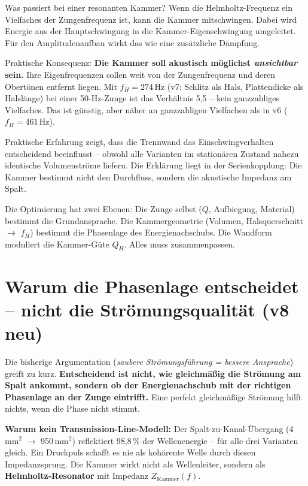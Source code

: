 \documentclass[11pt,a4paper]{article}
\begin{document}
Was passiert bei einer resonanten Kammer? Wenn die Helmholtz-Frequenz ein Vielfaches der Zungenfrequenz ist, kann die Kammer mitschwingen. Dabei wird Energie aus der Hauptschwingung in die Kammer-Eigenschwingung umgeleitet. Für den Amplitudenaufbau wirkt das wie eine zusätzliche Dämpfung.

Praktische Konsequenz: \textbf{Die Kammer soll akustisch möglichst \emph{unsichtbar} sein.} Ihre Eigenfrequenzen sollen weit von der Zungenfrequenz und deren Obertönen entfernt liegen. Mit $f_H = 274$\,Hz (v7: Schlitz als Hals, Plattendicke als Halslänge) bei einer 50-Hz-Zunge ist das Verhältnis 5{,}5 -- kein ganzzahliges Vielfaches. Das ist günstig, aber näher an ganzzahligen Vielfachen als in v6 ($f_H = 461$\,Hz).

Praktische Erfahrung zeigt, dass die Trennwand das Einschwingverhalten entscheidend beeinflusst -- obwohl alle Varianten im stationären Zustand nahezu identische Volumenströme liefern. Die Erklärung liegt in der Serienkopplung: Die Kammer bestimmt nicht den Durchfluss, sondern die akustische Impedanz am Spalt.

\begin{keybox}
Die Optimierung hat zwei Ebenen: Die Zunge selbst ($Q$, Aufbiegung, Material) bestimmt die Grundansprache. Die Kammergeometrie (Volumen, Halsquerschnitt $\to$ $f_H$) bestimmt die Phasenlage des Energienachschubs. Die Wandform moduliert die Kammer-Güte $Q_H$. Alles muss zusammenpassen.
\end{keybox}

\section{Warum die Phasenlage entscheidet -- nicht die Strömungsqualität (v8 neu)}

Die bisherige Argumentation (\emph{saubere Strömungsführung = bessere Ansprache}) greift zu kurz. \textbf{Entscheidend ist nicht, wie gleichmäßig die Strömung am Spalt ankommt, sondern ob der Energienachschub mit der richtigen Phasenlage an der Zunge eintrifft.} Eine perfekt gleichmäßige Strömung hilft nichts, wenn die Phase nicht stimmt.

\textbf{Warum kein Transmission-Line-Modell:} Der Spalt-zu-Kanal-Übergang (4\,mm$^2$ $\to$ 950\,mm$^2$) reflektiert 98{,}8\,\% der Wellenenergie -- für alle drei Varianten gleich. Ein Druckpuls schafft es nie als kohärente Welle durch diesen Impedanzsprung. Die Kammer wirkt nicht als Wellenleiter, sondern als \textbf{Helmholtz-Resonator} mit Impedanz $Z_\text{Kammer}(f)$.
\end{document}
